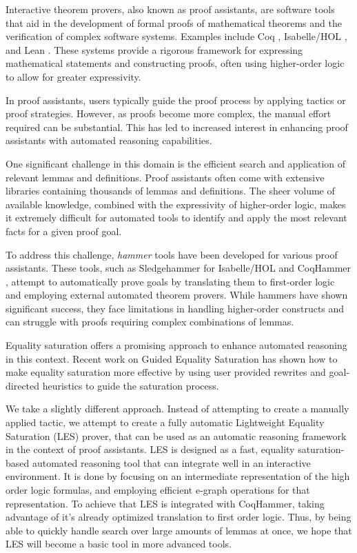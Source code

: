 Interactive theorem provers, also known as proof assistants, are software tools that aid in the development of formal proofs of mathematical theorems and the verification of complex software systems. 
Examples include Coq \cite{Coq:manual}, Isabelle/HOL \cite{Book2002:Nipkow}, and Lean \cite{lean}. 
These systems provide a rigorous framework for expressing mathematical statements and constructing proofs, often using higher-order logic to allow for greater expressivity.

In proof assistants, users typically guide the proof process by applying tactics or proof strategies. 
However, as proofs become more complex, the manual effort required can be substantial. 
This has led to increased interest in enhancing proof assistants with automated reasoning capabilities.

One significant challenge in this domain is the efficient search and application of relevant lemmas and definitions. 
Proof assistants often come with extensive libraries containing thousands of lemmas and definitions. 
The sheer volume of available knowledge, combined with the expressivity of higher-order logic, makes it extremely difficult for automated tools to identify and apply the most relevant facts for a given proof goal.

To address this challenge, \emph{hammer} tools have been developed for various proof assistants. These tools, such as Sledgehammer for Isabelle/HOL \cite{sledgehammer} and CoqHammer \cite{coqhammer}, attempt to automatically prove goals by translating them to first-order logic and employing external automated theorem provers. 
While hammers have shown significant success, they face limitations in handling higher-order constructs and can struggle with proofs requiring complex combinations of lemmas.

Equality saturation offers a promising approach to enhance automated reasoning in this context.
Recent work on Guided Equality Saturation \cite{guidedeqsat} has shown how to make equality saturation more effective by using user provided rewrites and goal-directed heuristics to guide the saturation process. 

We take a slightly different approach.
Instead of attempting to create a manually applied tactic, we attempt to create a fully automatic Lightweight Equality Saturation (LES) prover, that can be used as an automatic reasoning framework in the context of proof assistants.
LES is designed as a fast, equality saturation-based automated reasoning tool that can integrate well in an interactive environment. 
It is done by focusing on an intermediate representation of the high order logic formulas, and employing efficient e-graph operations for that representation.
To achieve that LES is integrated with CoqHammer, taking advantage of it's already optimized translation to first order logic.
Thus, by being able to quickly handle search over large amounts of lemmas at once, we hope that LES will become a basic tool in more advanced tools.


